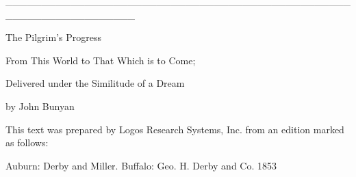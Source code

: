 __________________________________________________________________

The Pilgrim's Progress

From This World to That Which is to Come;

Delivered under the Similitude of a Dream

by John Bunyan

This text was prepared by Logos Research Systems, Inc. from an edition
marked as follows:

Auburn:
Derby and Miller.
Buffalo:
Geo. H. Derby and Co.
1853
